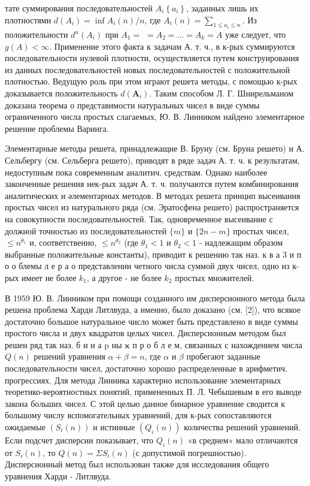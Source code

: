 \documentclass[10pt]{article}
\begin{document}
тате суммирования последовательностей $A_{i}\left\{a_{i}\right\}$, заданных лишь их плотностями $d\left(A_{i}\right)=\inf A_{i}(n) / n$, где $A_{i}(n)=\sum_{1 \leqslant a_{i} \leqslant n}$. Из положительности $d^{n}\left(A_{i}\right)$ при $A_{1}=$ $=A_{2}=\ldots=A_{k}=A$ уже следует, что $g(A)<\infty$. Применение этого факта к задачам А. т. ч., в к-рых суммируются последовательности нулевой плотности, осуществляется путем конструирования из данных последовательностей новых последовательностей с положительной плотностью. Ведущую роль при этом играют решета методы, с помощью к-рых доказывается положительность $d\left(\boldsymbol{A}_{i}\right)$. Таким способом Л. Г. Шнирельманом доказана теорема о представимости натуральных чисел в виде суммы ограниченного числа простых слагаемых, Ю. В. Линником найдено элементарное решение проблемы Варинга.



Элементарные методы решета, принадлежащие В. Бруну (см. Бруна решето) и А. Сельбергу (см. Сельберга решето), приводят в ряде задач А. т. ч. к результатам, недоступным пока современным аналитич. средствам. Однако наиболее законченные решения нек-рых задач А. т. ч. получаются путем комбинирования аналитических и әлементарных методов. В методах решета принцип высеивания простых чисел из натурального ряда (см. Эратосфена решето) распространяется на совокупности последовательностей. Так, одновременное высеивание с должной точностью из последовательностей $\{m\}$ и $\{2 n-m\}$ простых чисел, $\leqslant n^{\theta_{1}}$ и, соответственно, $\leqslant n^{\theta_{2}}$ (где $\theta_{1}<1$ и $\theta_{2}<1$ - надлежащим образом выбранные положительные константы), приводит к решению так наз. к в а 3 и п о о блемы л е р а о представлении четного числа суммой двух чисел, одно из к-рых имеет не более $k_{1}$, а другое - не более $k_{2}$ простых множителей.



В 1959 Ю. В. Линником при помощи созданного им дисперсионного метода была решена проблема Харди Литлвуда, а именно, было доказано (см. [2]), что всякое достаточно большое натуральное число может быть представлено в виде суммы простого числа и двух квадратов целых чисел. Дисперсионным методом был решен ряд так наз. б и н а $\mathrm{p}$ ны $\mathbf{x}$ п р о б л е м, связанных с нахождением числа $Q(n)$ решений уравнения $\alpha+\beta=n$, где $\alpha$ и $\beta$ пробегают заданные последовательности чисел, достаточно хорошо распределенные в арифметич. прогрессиях. Для метода Линника характерно использование элементарных теоретико-вероятностных понятий, примененных П. Л. Чебышевым в его выводе закона больших чисел. С этой целью данное бинарное уравнение сводится к большому числу вспомогательных уравнений, для к-рых сопоставляются ожидаемые $\left(S_{i}(n)\right)$ и истинные $\left(Q_{i}(n)\right)$ количества решений уравнений. Если подсчет дисперсии показывает, что $Q_{i}(n)$ «в среднем» мало отличаются от $S_{i}(n)$, то $Q(n)=\Sigma S_{i}(n)$ (с допустимой погрешностью). Дисперсионный метод был использован также для исследования общего уравнения Харди - Литлвуда.
\end{document}
